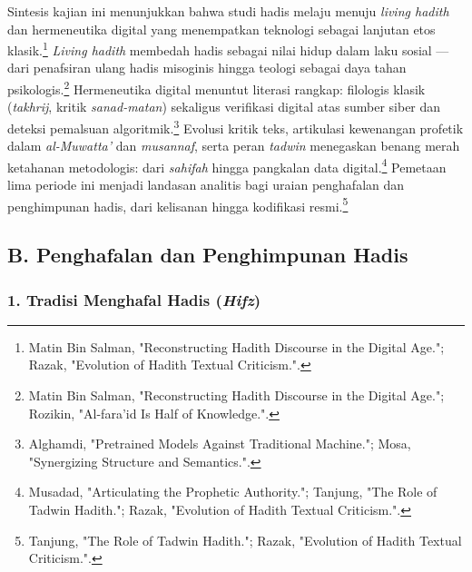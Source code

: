Sintesis kajian ini menunjukkan bahwa studi hadis melaju menuju \textit{living hadith} dan hermeneutika digital yang menempatkan teknologi sebagai lanjutan etos klasik.\footnote{Matin Bin Salman, "Reconstructing Hadith Discourse in the Digital Age."; Razak, "Evolution of Hadith Textual Criticism.".} \textit{Living hadith} membedah hadis sebagai nilai hidup dalam laku sosial --- dari penafsiran ulang hadis misoginis hingga teologi sebagai daya tahan psikologis.\footnote{Matin Bin Salman, "Reconstructing Hadith Discourse in the Digital Age."; Rozikin, "Al-fara'id Is Half of Knowledge.".} Hermeneutika digital menuntut literasi rangkap: filologis klasik (\textit{takhrij}, kritik \textit{sanad-matan}) sekaligus verifikasi digital atas sumber siber dan deteksi pemalsuan algoritmik.\footnote{Alghamdi, "Pretrained Models Against Traditional Machine."; Mosa, "Synergizing Structure and Semantics.".} Evolusi kritik teks, artikulasi kewenangan profetik dalam \textit{al-Muwatta'} dan \textit{musannaf}, serta peran \textit{tadwin} menegaskan benang merah ketahanan metodologis: dari \textit{sahifah} hingga pangkalan data digital.\footnote{Musadad, "Articulating the Prophetic Authority."; Tanjung, "The Role of Tadwin Hadith."; Razak, "Evolution of Hadith Textual Criticism.".} Pemetaan lima periode ini menjadi landasan analitis bagi uraian penghafalan dan penghimpunan hadis, dari kelisanan hingga kodifikasi resmi.\footnote{Tanjung, "The Role of Tadwin Hadith."; Razak, "Evolution of Hadith Textual Criticism.".}


\subsection*{B. Penghafalan dan Penghimpunan Hadis}

\subsubsection*{1. Tradisi Menghafal Hadis (\textit{Hifz})}

